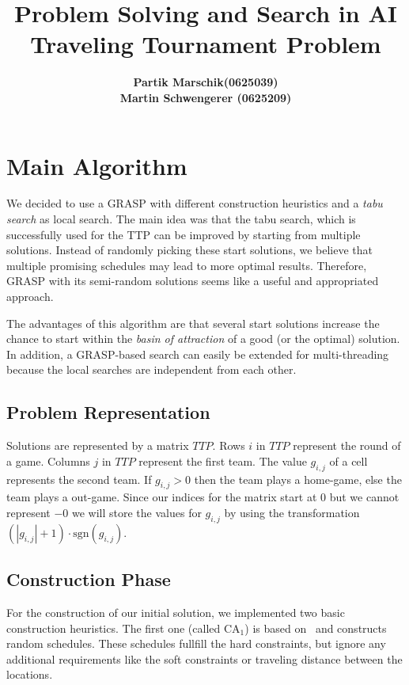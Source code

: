 \documentclass[a4paper,11pt]{article}
\title{ \LARGE \bf Problem Solving and Search in AI \\
\Large Traveling Tournament Problem }
\author{
\bf Partik Marschik(0625039) \\
\bf Martin Schwengerer (0625209) }
\begin{document}
\maketitle

\section{Main Algorithm}
We decided to use a \ac{GRASP} with different construction heuristics and a \emph{tabu search} as local search.
The main idea was that the tabu search, which is successfully used for the TTP \cite{Gaspero07} can be improved by starting from multiple solutions.
Instead of randomly picking these start solutions, we believe that multiple promising schedules may lead to more optimal results.
Therefore, \ac{GRASP} with its semi-random solutions seems like a useful and appropriated approach.

The advantages of this algorithm are that several start solutions increase the chance to start within the \emph{basin of attraction} of a good (or the optimal) solution.
In addition, a \ac{GRASP}-based search can easily be extended for multi-threading because the local searches are independent from each other.

\subsection{Problem Representation}
Solutions are represented by a matrix $TTP$.
Rows $i$ in $TTP$ represent the round of a game.
Columns $j$ in $TTP$ represent the first team.
The value $g_{i,j}$ of a cell represents the second team.
If $g_{i,j} > 0$ then the team plays a home-game, else the team plays a out-game.
Since our indices for the matrix start at $0$ but we cannot represent $-0$ we will
store the values for $g_{i,j}$ by using the transformation
$(|g_{i,j}| + 1) \cdot \text{sgn}(g_{i,j})$.

\subsection{Construction Phase}
For the construction of our initial solution, we implemented two basic construction heuristics.
The first one (called $\text{CA}_1$) is based on~\cite{Anagnostopoulos06} and constructs random schedules. These schedules fullfill the hard constraints, but ignore any additional
requirements like the soft constraints or traveling distance between the locations.
\end{document}
